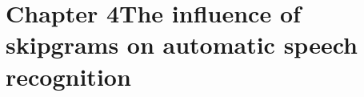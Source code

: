\chapter{Chapter 4\newline The influence of skipgrams on automatic speech recognition}\label{ch:speech}